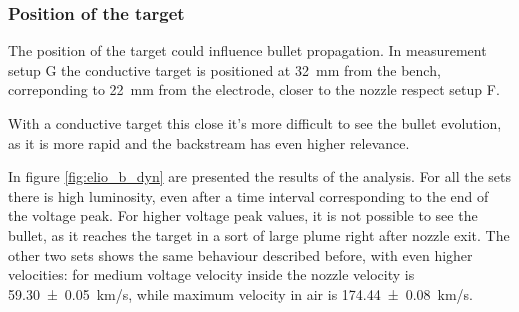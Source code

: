 \subsubsection{Position of the target}
The position of the target could influence bullet propagation. In measurement setup G the conductive target is positioned at \SI{32}{\milli\meter} from the bench, correponding to \SI{22}{\milli\meter} from the electrode, closer to the nozzle respect setup F.

With a conductive target this close it's more difficult to see the bullet evolution, as it is more rapid and the backstream has even higher relevance.

In figure \ref{fig:elio_b_dyn} are presented the results of the analysis. For all the sets there is high luminosity, even after a time interval corresponding to the end of the voltage peak.
For higher voltage peak values, it is not possible to see the bullet, as it reaches the target in a sort of large plume right after nozzle exit. The other two sets shows the same behaviour described before, with even higher velocities: for medium voltage velocity inside the nozzle velocity is \SI{59.30(5)}{\kilo\meter/\second}, while maximum velocity in air is \SI{174.44(8)}{\kilo\meter/\second}.
